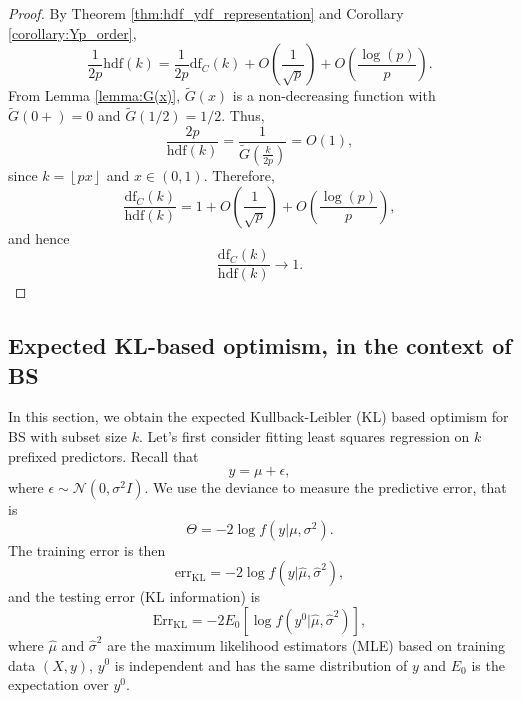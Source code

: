\dfasycorollary*
\begin{proof}
	By Theorem \ref{thm:hdf_ydf_representation} and Corollary \ref{corollary:Yp_order},
	\begin{equation*}
	\frac{1}{2p} \text{hdf}(k) = \frac{1}{2p}\text{df}_C(k) + O\left(\frac{1}{\sqrt{p}}\right) + O\left(\frac{\log(p)}{p} \right).
	\end{equation*}
	From Lemma \ref{lemma:G(x)}, $\tilde{G}(x)$ is a non-decreasing function with $\tilde{G}(0+)=0$ and $\tilde{G}(1/2)=1/2$. Thus, 
	\begin{equation*}
	\frac{2p}{\text{hdf}(k)} = \frac{1}{\tilde{G}\left(\frac{k}{2p}\right)} = O(1),
	\end{equation*}
	since $k=\left \lfloor{px}\right \rfloor$ and $x\in(0,1)$. Therefore, 
	\begin{equation*}
	\frac{\text{df}_C(k)}{\text{hdf}(k)} = 1 + O\left(\frac{1}{\sqrt{p}}\right) + O\left(\frac{\log(p)}{p} \right),
	\end{equation*}
	and hence
	\begin{equation*}
	\frac{\text{df}_C(k)}{\text{hdf}(k)} \to 1.
	\end{equation*}
\end{proof}

\subsection{Expected KL-based optimism, in the context of BS }
\label{sec:expectedkl_bs}
In this section, we obtain the expected Kullback-Leibler (KL) based optimism for BS with subset size $k$. Let's first consider fitting least squares regression on $k$ prefixed predictors. Recall that 
\begin{equation*}
y = \mu + \epsilon,
\end{equation*}
where $\epsilon \sim \mathcal{N}(0,\sigma^2 I)$. We use the deviance to measure the predictive error, that is 
\begin{equation*}
\Theta=-2 \log f(y|\mu,\sigma^2).
\end{equation*}
The training error is then 
$$\text{err}_{\text{KL}} = -2 \log f (y|\hat{\mu},\hat{\sigma}^2),$$
and the testing error (KL information) is
$$\text{Err}_{\text{KL}}  = -2 E_0 \left[ \log f(y^0|\hat{\mu},\hat{\sigma}^2)\right],$$
where $\hat{\mu}$ and $\hat{\sigma}^2$ are the maximum likelihood estimators (MLE) based on training data $(X,y)$, $y^0$ is independent and has the same distribution of $y$ and $E_0$ is the expectation over $y^0$. 

